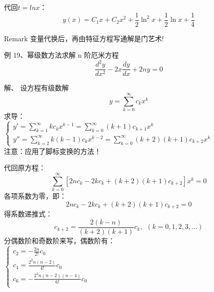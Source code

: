 \begin{frame}
	代回$t=ln x $：
	\begin{equation*}
		y(x)=C_1 x +C_2 x^2+\frac{1}{2} \ln ^2 x+\frac{1}{2}\ln x+\frac{1}{4}
	\end{equation*} 
	\begin{block} {Remark}
		变量代换后，再由特征方程写通解是门艺术!
	\end{block}  
\end{frame}

\begin{frame}
	\begin{exampleblock} {例 19、幂级数方法求解 n 阶厄米方程}
	\begin{equation*}
		\frac{d^2 y}{d x^2} -2x \frac{d y}{d x} +2n y =0 
	\end{equation*}     
	\end{exampleblock}	
	\alert{解、} 	设方程有级数解
	\begin{equation*}
		y=\sum_{k=0}^{\infty} c_k x^k
	\end{equation*}     
	求导：\\
	$\begin{cases}
		y' = \sum\limits_{k=1}^{\infty} k c_k x^{k-1} =\sum\limits_{k=0}^{\infty} (k+1) c_{k+1} x^{k}\\
		y'' = \sum\limits_{k=2}^{\infty} k (k-1) c_k x^{k-2} =  \sum\limits_{k=0}^{\infty} (k+2) (k+1) c_{k+2} x^k
	\end{cases}$ \\ \vspace{0.3em}
	注意：应用了脚标变换的方法！
 \end{frame}

\begin{frame}
	代回原方程：
	\begin{equation*}
		\sum_{k=0}^{\infty} [ 2nc_k -2kc_k +(k+2)(k+1) c_{k+2}  ] x^k  =0
	\end{equation*}  
	各项系数为零，即： 
	\begin{equation*}
		2nc_k -2kc_k +(k+2)(k+1) c_{k+2} =0
	\end{equation*}   
	得系数递推式：
	\begin{equation*}
		c_{k+2} = \frac{ 2(k-n)}{(k+2)(k+1) } c_k, ~~  \left( k=0,1,2,3, ...  \right)
	\end{equation*}   
	分偶数阶和奇数阶来写，偶数阶有： \\
	$\displaystyle \begin{cases}
		c_2 =- \frac{2n}{2!} c_0\\
		c_4 = \frac{2^2n(n-2)}{4!} c_0 \\
		c_6 = -\frac{2^3n(n-2)(n-4)}{6!} c_0 \\	
	\end{cases}$ \\
\end{frame}

